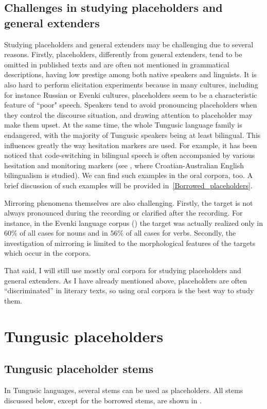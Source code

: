 \documentclass[output=paper,colorlinks,citecolor=brown
\ChapterDOI{10.5281/zenodo.15697577}
]{langscibook}
\begin{document}
\subsection{Challenges in studying placeholders and general extenders}
Studying placeholders and general extenders may be challenging due to several reasons. Firstly, placeholders, differently from general extenders, tend to be omitted in published texts and are often not mentioned in grammatical descriptions, having low prestige among both native speakers and linguists. It is also hard to perform elicitation experiments because in many cultures, including for instance Russian or Evenki cultures, placeholders seem to be a characteristic feature of ``poor" speech. Speakers tend to avoid pronouncing placeholders when they control the discourse situation, and drawing attention to placeholder may make them upset. At the same time, the whole Tungusic language family is endangered, with the majority of Tungusic speakers being at least bilingual. This influences greatly the way hesitation markers are used. For example, it has been noticed that code-switching in bilingual speech is often accompanied by various hesitation and monitoring markers (see \citealt{hlavac2011hesitation}, where Croatian-Australian English bilingualism is studied). We can find such examples in the oral corpora, too. A brief discussion of such examples will be provided in~\ref{Borrowed_placeholders}.

Mirroring phenomena themselves are also challenging. Firstly, the target is not always pronounced during the recording or clarified after the recording. For instance, in the Evenki language corpus (\cite{EvenkiCorpusSiberianLang}) the target was actually realized only in $60\%$ of all cases for nouns and in $56\%$ of all cases for verbs. Secondly, the investigation of mirroring is limited to the morphological features of the targets which occur in the corpora.

That said, I will still use mostly oral corpora for studying placeholders and general extenders. As I have already mentioned above, placeholders are often ``discriminated'' in literary texts, so using oral corpora is the best way to study them.


\section{Tungusic placeholders}
\subsection{Tungusic placeholder stems}
In Tungusic languages, several stems can be used as placeholders. All stems discussed below, except for the borrowed stems, are shown in .
\end{document}
